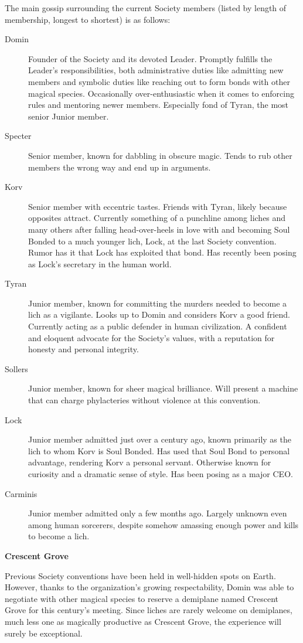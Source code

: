 \documentclass[blue]{Sel}
\begin{document}
The main gossip surrounding the current Society members (listed by length of membership, longest to shortest) is as follows:
\begin{description}
\item [Domin] Founder of the Society and its devoted Leader. Promptly fulfills the Leader's responsibilities, both administrative duties like admitting new members and symbolic duties like reaching out to form bonds with other magical species. Occasionally over-enthusiastic when it comes to enforcing rules and mentoring newer members. Especially fond of Tyran, the most senior Junior member.
\item [Specter] Senior member, known for dabbling in obscure magic. Tends to rub other members the wrong way and end up in arguments.
\item [Korv] Senior member with eccentric tastes. Friends with Tyran, likely because opposites attract. Currently something of a punchline among liches and many others after falling head-over-heels in love with and becoming Soul Bonded to a much younger lich, Lock, at the last Society convention. Rumor has it that Lock has exploited that bond. Has recently been posing as Lock's secretary in the human world.
\item [Tyran] Junior member, known for committing the murders needed to become a lich as a vigilante. Looks up to Domin and considers Korv a good friend. Currently acting as a public defender in human civilization. A confident and eloquent advocate for the Society's values, with a reputation for honesty and personal integrity.
\item [Sollers] Junior member, known for sheer magical brilliance. Will present a machine that can charge phylacteries without violence at this convention.
\item [Lock] Junior member admitted just over a century ago, known primarily as the lich to whom Korv is Soul Bonded. Has used that Soul Bond to personal advantage, rendering Korv a personal servant. Otherwise known for curiosity and a dramatic sense of style. Has been posing as a major CEO.
\item [Carminis] Junior member admitted only a few months ago. Largely unknown even among human sorcerers, despite somehow amassing enough power and kills to become a lich.
\end{description}

\textbf{Crescent Grove}

Previous Society conventions have been held in well-hidden spots on Earth. However, thanks to the organization's growing respectability, Domin was able to negotiate with other magical species to reserve a demiplane named Crescent Grove for this century's meeting. Since liches are rarely welcome on demiplanes, much less one as magically productive as Crescent Grove, the experience will surely be exceptional.
\end{document}
